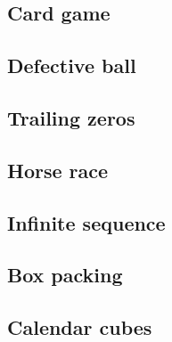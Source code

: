 \documentclass[12pt, a4paper, oneside]{article}
\begin{document}
\subsection{ Card game }
\subsection{ Defective ball }
\subsection{ Trailing zeros }
\subsection{ Horse race }
\subsection{ Infinite sequence }
\subsection{ Box packing }
\subsection{ Calendar cubes }
\end{document}
